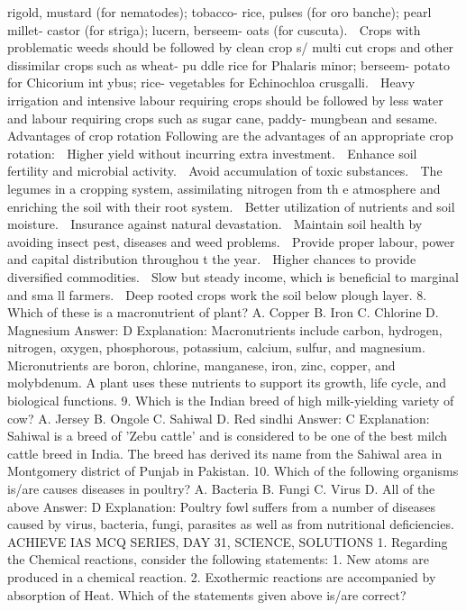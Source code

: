 rigold, mustard (for nematodes); tobacco- rice, pulses (for oro
banche); pearl millet- castor (for striga); lucern, berseem- oats
(for cuscuta).
 Crops with problematic weeds should be followed by clean crop
s/ multi cut crops and other dissimilar crops such as wheat- pu
ddle rice for Phalaris minor; berseem- potato for Chicorium int
ybus; rice- vegetables for Echinochloa crusgalli.
 Heavy irrigation and intensive labour requiring crops should be
followed by less water and labour requiring crops such as sugar
cane, paddy- mungbean and sesame.
Advantages of crop rotation
Following are the advantages of an appropriate crop rotation:
 Higher yield without incurring extra investment.
 Enhance soil fertility and microbial activity.
 Avoid accumulation of toxic substances.
 The legumes in a cropping system, assimilating nitrogen from th
e atmosphere and enriching the soil with their root system.
 Better utilization of nutrients and soil moisture.
 Insurance against natural devastation.
 Maintain soil health by avoiding insect pest, diseases and weed
problems.
 Provide proper labour, power and capital distribution throughou
t the year.
 Higher chances to provide diversified commodities.
 Slow but steady income, which is beneficial to marginal and sma
ll farmers.
 Deep rooted crops work the soil below plough layer.
8. Which of these is a macronutrient of plant?
A. Copper
B. Iron
C. Chlorine
D. Magnesium
Answer: D
Explanation: Macronutrients include carbon, hydrogen, nitrogen,
oxygen, phosphorous, potassium, calcium, sulfur, and magnesium.
Micronutrients are boron, chlorine, manganese, iron, zinc, copper,
and molybdenum. A plant uses these nutrients to support its growth,
life cycle, and biological functions.
9. Which is the Indian breed of high milk-yielding variety of
cow?
A. Jersey
B. Ongole
C. Sahiwal
D. Red sindhi
Answer: C
Explanation: Sahiwal is a breed of 'Zebu cattle' and is considered
to be one of the best milch cattle breed in India. The breed has
derived its name from the Sahiwal area in Montgomery district of
Punjab in Pakistan.
10. Which of the following organisms is/are causes diseases in
poultry?
A. Bacteria
B. Fungi
C. Virus
D. All of the above
Answer: D
Explanation: Poultry fowl suffers from a number of diseases caused
by virus, bacteria, fungi, parasites as well as from nutritional
deficiencies.
ACHIEVE IAS MCQ SERIES, DAY 31, SCIENCE, SOLUTIONS
1. Regarding the Chemical reactions, consider the following
statements:
1. New atoms are produced in a chemical reaction.
2. Exothermic reactions are accompanied by absorption of Heat.
Which of the statements given above is/are correct?
